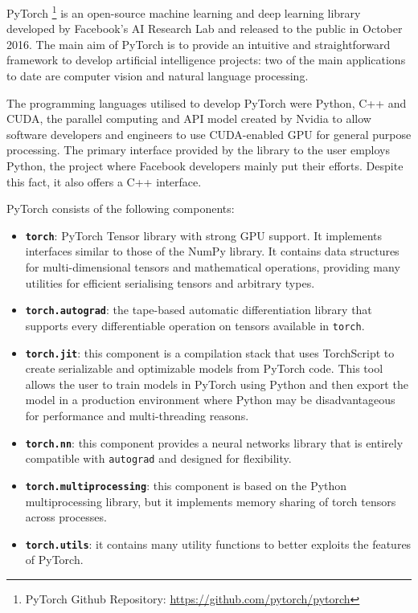 PyTorch \footnote{PyTorch Github Repository: \href{https://github.com/pytorch/pytorch}{https://github.com/pytorch/pytorch}} \cite{paszke2017automatic}  is an open-source machine learning and deep learning library developed by Facebook's AI Research Lab and released to the public in October 2016.
The main aim of PyTorch is to provide an intuitive and straightforward framework to develop artificial intelligence projects: two of the main applications to date are computer vision and natural language processing.

The programming languages utilised to develop PyTorch were Python, C++ and CUDA, the parallel computing and API model created by Nvidia to allow software developers and engineers to use CUDA-enabled GPU for general purpose processing.
The primary interface provided by the library to the user employs Python, the project where Facebook developers mainly put their efforts.
Despite this fact, it also offers a C++ interface.

PyTorch consists of the following components:
\begin{itemize}
	\item \textbf{\texttt{torch}}: PyTorch Tensor library with strong GPU support.
It implements interfaces similar to those of the NumPy library.
It contains data structures for multi-dimensional tensors and mathematical operations, providing many utilities for efficient serialising tensors and arbitrary types.
	\item \textbf{\texttt{torch.autograd}}: the tape-based automatic differentiation library that supports every differentiable operation on tensors available in \texttt{torch}.
	\item \textbf{\texttt{torch.jit}}: this component is a compilation stack that uses TorchScript to create serializable and optimizable models from PyTorch code.
This tool allows the user to train models in PyTorch using Python and then export the model in a production environment where Python may be disadvantageous for performance and multi-threading reasons.
	\item \textbf{\texttt{torch.nn}}: this component provides a neural networks library that is entirely compatible with \texttt{autograd} and designed for flexibility.
	\item \textbf{\texttt{torch.multiprocessing}}: this component is based on the Python multiprocessing library, but it implements memory sharing of torch tensors across processes.
	\item \textbf{\texttt{torch.utils}}: it contains many utility functions to better exploits the features of PyTorch.
\end{itemize}

